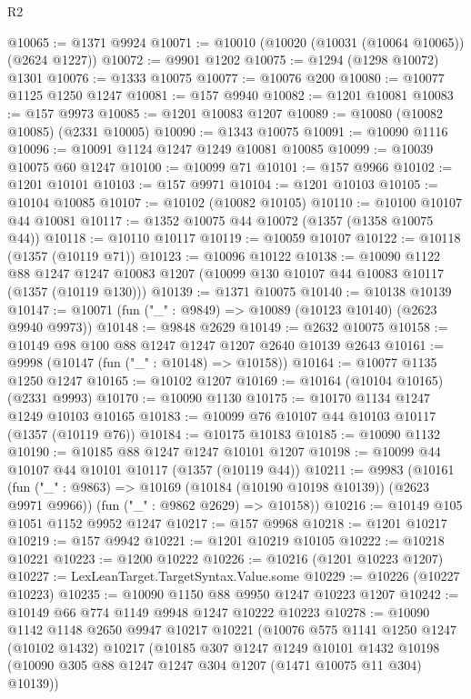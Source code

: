 \begin{lexlean}{R2}
\begin{coremodule}
@10065 := @1371 @9924
@10071 := @10010 (@10020 (@10031 (@10064 @10065)) (@2624 @1227))
@10072 := @9901 @1202
@10075 := @1294 (@1298 @10072) @1301
@10076 := @1333 @10075
@10077 := @10076 @200
@10080 := @10077 @1125 @1250 @1247
@10081 := @157 @9940
@10082 := @1201 @10081
@10083 := @157 @9973
@10085 := @1201 @10083 @1207
@10089 := @10080 (@10082 @10085) (@2331 @10005)
@10090 := @1343 @10075
@10091 := @10090 @1116
@10096 := @10091 @1124 @1247 @1249 @10081 @10085
@10099 := @10039 @10075 @60 @1247
@10100 := @10099 @71
@10101 := @157 @9966
@10102 := @1201 @10101
@10103 := @157 @9971
@10104 := @1201 @10103
@10105 := @10104 @10085
@10107 := @10102 (@10082 @10105)
@10110 := @10100 @10107 @44 @10081
@10117 := @1352 @10075 @44 @10072 (@1357 (@1358 @10075 @44))
@10118 := @10110 @10117
@10119 := @10059 @10107
@10122 := @10118 (@1357 (@10119 @71))
@10123 := @10096 @10122
@10138 := @10090
    @1122
    @88
    @1247
    @1247
    @10083
    @1207
    (@10099 @130 @10107 @44 @10083 @10117 (@1357 (@10119 @130)))
@10139 := @1371 @10075
@10140 := @10138 @10139
@10147 := @10071 (fun ("_" : @9849) => @10089 (@10123 @10140) (@2623 @9940 @9973))
@10148 := @9848 @2629
@10149 := @2632 @10075
@10158 := @10149 @98 @100 @88 @1247 @1247 @1207 @2640 @10139 @2643
@10161 := @9998 (@10147 (fun ("_" : @10148) => @10158))
@10164 := @10077 @1135 @1250 @1247
@10165 := @10102 @1207
@10169 := @10164 (@10104 @10165) (@2331 @9993)
@10170 := @10090 @1130
@10175 := @10170 @1134 @1247 @1249 @10103 @10165
@10183 := @10099 @76 @10107 @44 @10103 @10117 (@1357 (@10119 @76))
@10184 := @10175 @10183
@10185 := @10090 @1132
@10190 := @10185 @88 @1247 @1247 @10101 @1207
@10198 := @10099 @44 @10107 @44 @10101 @10117 (@1357 (@10119 @44))
@10211 := @9983
    (@10161
      (fun ("_" : @9863) => @10169 (@10184 (@10190 @10198 @10139)) (@2623 @9971 @9966))
      (fun ("_" : @9862 @2629) => @10158))
@10216 := @10149 @105 @1051 @1152 @9952 @1247
@10217 := @157 @9968
@10218 := @1201 @10217
@10219 := @157 @9942
@10221 := @1201 @10219 @10105
@10222 := @10218 @10221
@10223 := @1200 @10222
@10226 := @10216 (@1201 @10223 @1207)
@10227 := LexLeanTarget.TargetSyntax.Value.some
@10229 := @10226 (@10227 @10223)
@10235 := @10090 @1150 @88 @9950 @1247 @10223 @1207
@10242 := @10149 @66 @774 @1149 @9948 @1247 @10222 @10223
@10278 := @10090
    @1142
    @1148
    @2650
    @9947
    @10217
    @10221
    (@10076
      @575
      @1141
      @1250
      @1247
      (@10102 @1432)
      @10217
      (@10185
        @307
        @1247
        @1249
        @10101
        @1432
        @10198
        (@10090 @305 @88 @1247 @1247 @304 @1207 (@1471 @10075 @11 @304) @10139))

\end{coremodule}
\end{lexlean}
